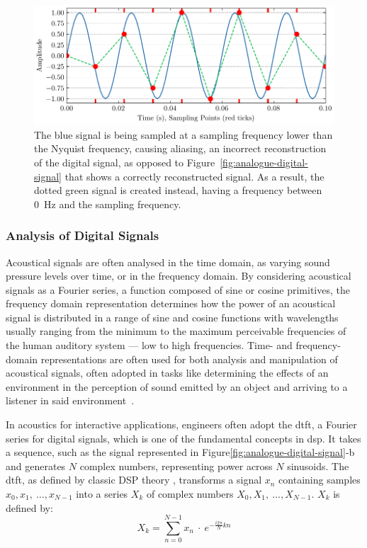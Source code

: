 \begin{figure}
    \centering
    \includegraphics[width=1\linewidth]{aliasing}
    \caption[Digital reconstruction of analogue signal]{The blue signal is being sampled at a sampling frequency lower than the Nyquist frequency, causing aliasing, an incorrect reconstruction of the digital signal, as opposed to Figure~\ref{fig:analogue-digital-signal} that shows a correctly reconstructed signal. As a result, the dotted green signal is created instead, having a frequency between \qty{0}{\hertz} and the sampling frequency.}
\label{fig:aliasing}
\end{figure}

\subsubsection{Analysis of Digital Signals}
Acoustical signals are often analysed in the time domain, as varying sound pressure levels over time, or in the frequency domain. By considering acoustical signals as a Fourier series, a function composed of sine or cosine primitives, the frequency domain representation determines how the power of an acoustical signal is distributed in a range of sine and cosine functions with wavelengths usually ranging from the minimum to the maximum perceivable frequencies of the human auditory system --- low to high frequencies. Time- and frequency-domain representations are often used for both analysis and manipulation of acoustical signals, often adopted in tasks like determining the effects of an environment in the perception of sound emitted by an object and arriving to a listener in said environment~\cite{ballou2013handbook}.\par 
In acoustics for interactive applications, engineers often adopt the \acrfull{dtft}, a Fourier series for digital signals, which is one of the fundamental concepts in \acrshort{dsp}. It takes a sequence, such as the signal represented in Figure\ref{fig:analogue-digital-signal}-b and generates $N$ complex numbers, representing power across $N$ sinusoids. The \acrshort{dtft}, as defined by classic DSP theory \cite{shenoi2005introduction}, transforms a signal $x_n$ containing samples $x_0, x_1,~\dots, x_{N-1}$ into a series $X_k$ of complex numbers $X_0, X_1,~\dots, X_{N-1}$. $X_k$ is defined by:
\begin{equation}
    X_k = \sum_{n=0}^{N-1} x_n~\cdot~e^{-\frac{i2\pi}{N}kn}
\end{equation}

